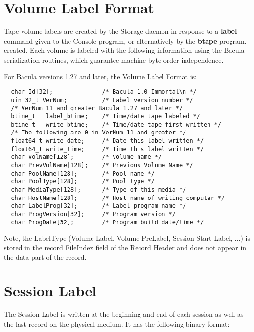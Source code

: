 \section{Volume Label Format}

Tape volume labels are created by the Storage daemon in response to a {\bf
label} command given to the Console program, or alternatively by the {\bf
btape} program. created. Each volume is labeled with the following information
using the Bacula serialization routines, which guarantee machine byte order
independence. 

For Bacula versions 1.27 and later, the Volume Label Format is: 

\footnotesize
\begin{verbatim}
  char Id[32];              /* Bacula 1.0 Immortal\n */
  uint32_t VerNum;          /* Label version number */
  /* VerNum 11 and greater Bacula 1.27 and later */
  btime_t   label_btime;    /* Time/date tape labeled */
  btime_t   write_btime;    /* Time/date tape first written */
  /* The following are 0 in VerNum 11 and greater */
  float64_t write_date;     /* Date this label written */
  float64_t write_time;     /* Time this label written */
  char VolName[128];        /* Volume name */
  char PrevVolName[128];    /* Previous Volume Name */
  char PoolName[128];       /* Pool name */
  char PoolType[128];       /* Pool type */
  char MediaType[128];      /* Type of this media */
  char HostName[128];       /* Host name of writing computer */
  char LabelProg[32];       /* Label program name */
  char ProgVersion[32];     /* Program version */
  char ProgDate[32];        /* Program build date/time */
\end{verbatim}
\normalsize

Note, the LabelType (Volume Label, Volume PreLabel, Session Start Label, ...)
is stored in the record FileIndex field of the Record Header and does not
appear in the data part of the record. 

\section{Session Label}

The Session Label is written at the beginning and end of each session as well
as the last record on the physical medium. It has the following binary format:


